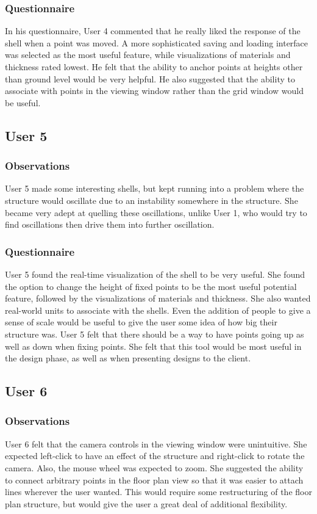 \documentclass{thesis}
\begin{document}
\subsubsection{Questionnaire}
In his questionnaire, User 4 commented that he really liked the response of the shell when a point was moved.  A more sophisticated
saving and loading interface was selected as the most useful feature, while visualizations of materials and thickness rated lowest.
He felt that the ability to anchor points at heights other than ground level would be very helpful.  He also suggested that the ability
to associate with points in the viewing window rather than the grid window would be useful.

\subsection{User 5}
\subsubsection{Observations}
User 5 made some interesting shells, but kept running into a problem where the structure would oscillate due to an instability
somewhere in the structure.  She became very adept at quelling these oscillations, unlike User 1, who would try to find oscillations
then drive them into further oscillation.

\subsubsection{Questionnaire}
User 5 found the real-time visualization of the shell to be very useful.  She found the option to change the height of fixed points
to be the most useful potential feature, followed by the visualizations of materials and thickness.  She also wanted real-world
units to associate with the shells.  Even the addition of people to give a sense of scale would be useful to give the user some
idea of how big their structure was.  User 5 felt that there should be a way to have points going up as well as down when fixing
points.  She felt that this tool would be most useful in the design phase, as well as when presenting designs to the client.

\subsection{User 6}
\subsubsection{Observations}
User 6 felt that the camera controls in the viewing window were unintuitive.  She expected left-click to have an effect of the
structure and right-click to rotate the camera.  Also, the mouse wheel was expected to zoom.  She suggested the ability to
connect arbitrary points in the floor plan view so that it was easier to attach lines wherever the user wanted.  This would
require some restructuring of the floor plan structure, but would give the user a great deal of additional flexibility.
\end{document}
